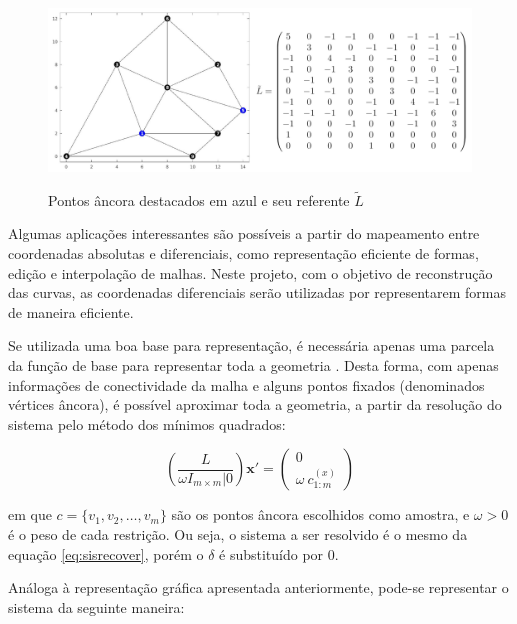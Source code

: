 \begin{figure}[htb]
    \centering
    \caption{Pontos âncora destacados em azul e seu referente $\tilde{L}$}
    \includegraphics{img/grafo_lapl_tilde.png}
    \label{fig:grafo_lapl_tilde}
\end{figure}

Algumas aplicações interessantes são possíveis a partir do mapeamento entre coordenadas absolutas e diferenciais, como representação eficiente de formas, edição e interpolação de malhas. Neste projeto, com o objetivo de reconstrução das curvas, as coordenadas diferenciais serão utilizadas por representarem formas de maneira eficiente.

Se utilizada uma boa base para representação, é necessária apenas uma parcela da função de base para representar toda a geometria \cite{sorkine2004}. Desta forma, com apenas informações de conectividade da malha e alguns pontos fixados (denominados vértices âncora), é possível aproximar toda a geometria, a partir da resolução do sistema pelo método dos mínimos quadrados:

\begin{equation}\label{eq:sisrecover2}
	\left( \frac{L}{\omega I_{m \times m} | 0} \right) \mathbf{x'} = \begin{pmatrix}
		0\\
		\omega\ c_{1:m}^{(x)}
	\end{pmatrix}
\end{equation}

\noindent em que $c = \{v_1, v_2, \dots, v_m\}$ são os pontos âncora escolhidos como amostra, e $\omega > 0$ é o peso de cada restrição. Ou seja, o sistema a ser resolvido é o mesmo da equação \ref{eq:sisrecover}, porém o $\delta$ é substituído por $0$.

Análoga à representação gráfica apresentada anteriormente, pode-se representar o sistema da seguinte maneira:

\begin{center}
\end{center}


